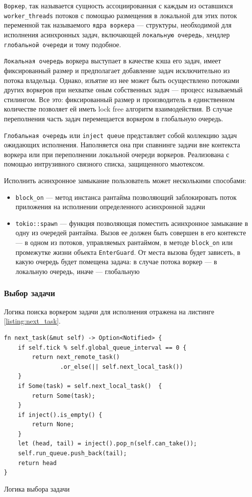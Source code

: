 \verb|Воркер|, так называется сущность ассоциированная с каждым из оставшихся \verb|worker_threads| потоков с помощью размещения в локальной для этих поток переменной так называемого \verb|ядра воркера| --- структуры, необходимой для исполнения асинхронных задач, включающей \verb|локальную очередь|, хендлер \verb|глобальной очереди| и тому подобное.

\verb|Локальная очередь| воркера выступает в качестве кэша его задач, имеет фиксированный размер и предполагает добавление задач исключительно из потока владельца. Однако, изъятие из нее может быть осуществлено потоками других воркеров при нехватке оным собственных задач --- процесс называемый стилингом. Все это: фиксированный размер и производитель в единственном количестве позволяет ей иметь lock free алгоритм взаимодействия. В случае переполнения часть задач перемещается воркером в глобальную очередь.

\verb|Глобальная очередь| или \verb|inject queue| представляет собой коллекцию задач ожидающих исполнения. Наполняется она при спавнинге задачи вне контекста воркера или при переполнении локальной очереди воркеров. Реализована с помощью интрузивного связного списка, защищенного мьютексом.

Исполнить асинхронное замыкание пользователь может несколькими способами:

\begin{itemize}
    \item \verb|block_on| --- метод инстанса рантайма позволяющий заблокировать поток приложения на исполнении определенного асинхронной задачи
    \item \verb|tokio::spawn| --- функция позволяющая поместить асинхронное замыкание в одну из очередей рантайма. Вызов ее должен быть совершен в его контексте --- в одном из потоков, управляемых рантаймом, в методе \verb|block_on| или промежутке жизни объекта \verb|EnterGuard|. От места вызова будет зависеть, в какую очередь будет помещена задача: в случае потока воркер --- в локальную очередь, иначе --- глобальную
\end{itemize}

\subsubsection{Выбор задачи}

Логика поиска воркером задачи для исполнения отражена на листинге \ref{listing:next_task}.

\begin{listing}[H]
    \begin{verbatim}
fn next_task(&mut self) -> Option<Notified> {
    if self.tick % self.global_queue_interval == 0 {
        return next_remote_task()
                .or_else(|| self.next_local_task())
    }
    if Some(task) = self.next_local_task()  {
        return Some(task);
    }
    if inject().is_empty() {
        return None;
    }
    let (head, tail) = inject().pop_n(self.can_take());
    self.run_queue.push_back(tail);
    return head
}
    \end{verbatim}

    \caption{Логика выбора задачи}
    \label{listing:next_task}
\end{listing}

